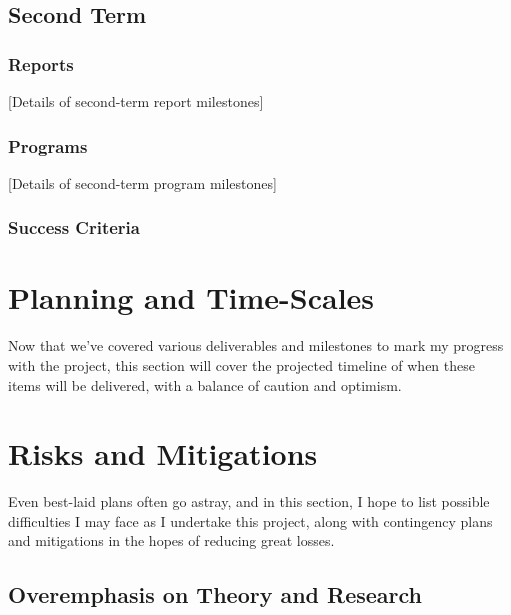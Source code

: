 \documentclass[report,10pt]{article}
\begin{document}
\subsection{Second Term}
\subsubsection{Reports}
[Details of second-term report milestones]

\subsubsection{Programs}
[Details of second-term program milestones]

\subsubsection{Success Criteria}
\pagebreak
\section{Planning and Time-Scales}
Now that we've covered various deliverables and milestones to mark my progress with the project, this section will cover the projected timeline of when these items will be delivered, with a balance of caution and optimism.
\pagebreak
\section{Risks and Mitigations}
Even best-laid plans often go astray, and in this section, I hope to list possible difficulties I may face as I undertake this project, along with contingency plans and mitigations in the hopes of reducing great losses.
\subsection{Overemphasis on Theory and Research}
\end{document}
